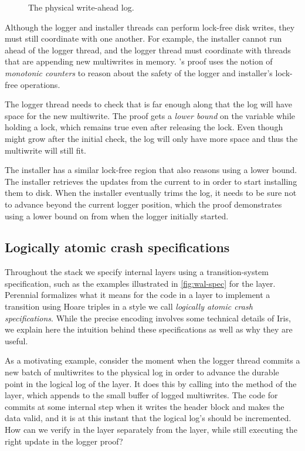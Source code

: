\begin{figure}
    \centering
    
    \caption{The physical write-ahead log.}
    \label{fig:physlog}
\end{figure}

Although the logger and installer threads can perform lock-free disk
writes, they must still coordinate with one another.  For example,
the installer cannot run ahead of the logger thread, and the logger
thread must coordinate with threads that are appending new multiwrites
in memory. \txn's proof uses the notion of \emph{monotonic counters} to reason
about the safety of the logger and installer's lock-free operations.

The logger thread needs to check that  is far enough along that the
log will have space for the new multiwrite. The proof gets a \emph{lower bound}
on the  variable while holding a lock, which remains true even
after releasing the lock. Even though  might grow after the initial
check, the log will only have more space and thus the multiwrite will still fit.

The installer has a similar lock-free region that also reasons using a lower
bound. The installer retrieves the updates from the current  to
 in order to start installing them to disk. When the installer
eventually trims the log, it needs to be sure not to advance beyond the current
logger position, which the proof demonstrates using a lower bound on
 from when the logger initially started.

\subsection{Logically atomic crash specifications}
\label{s:proof:logatom}

Throughout the \txn stack we specify internal layers using a transition-system
specification, such as the examples illustrated in \cref{fig:wal-spec} for
the  layer. Perennial formalizes what it means for the code in a layer to
implement a transition using Hoare triples in a style we call
\emph{logically atomic crash specifications}. While the precise encoding
involves some technical details of Iris, we explain here the intuition behind these
specifications as well as why they are useful.

As a motivating example, consider the moment when the logger thread commits a
new batch of multiwrites to the physical log in order to advance the durable
point  in the logical log of the  layer. It does this by calling into the
 method of the  layer, which appends to the small
buffer of logged multiwrites. The code for  commits at some internal
step when it writes the header block and makes the data valid, and it is at this
instant that the logical log's  should be incremented.
How can we verify  in the  layer separately from the  layer,
while still executing the right update in the logger proof?

